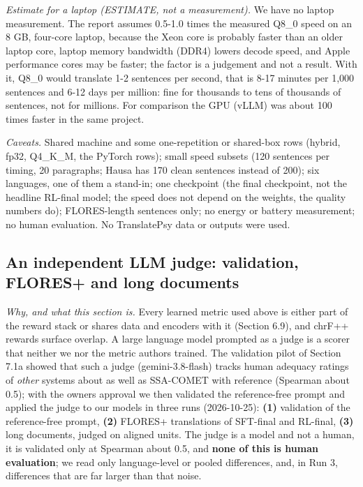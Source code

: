 \emph{Estimate for a laptop (ESTIMATE, not a measurement).} We have no laptop measurement. The report assumes 0.5-1.0 times the measured Q8\_0 speed on an 8 GB, four-core laptop, because the Xeon core is probably faster than an older laptop core, laptop memory bandwidth (DDR4) lowers decode speed, and Apple performance cores may be faster; the factor is a judgement and not a result. With it, Q8\_0 would translate 1-2 sentences per second, that is 8-17 minutes per 1,000 sentences and 6-12 days per million: fine for thousands to tens of thousands of sentences, not for millions. For comparison the GPU (vLLM) was about 100 times faster in the same project.

\emph{Caveats.} Shared machine and some one-repetition or shared-box rows (hybrid, fp32, Q4\_K\_M, the PyTorch rows); small speed subsets (120 sentences per timing, 20 paragraphs; Hausa has 170 clean sentences instead of 200); six languages, one of them a stand-in; one checkpoint (the final checkpoint, not the headline RL-final model; the speed does not depend on the weights, the quality numbers do); FLORES-length sentences only; no energy or battery measurement; no human evaluation. No TranslatePsy data or outputs were used.

\subsection{An independent LLM judge: validation, FLORES+ and long documents}\label{an-independent-llm-judge-validation-flores-and-long-documents}

\emph{Why, and what this section is.} Every learned metric used above is either part of the reward stack or shares data and encoders with it (Section 6.9), and chrF++ rewards surface overlap. A large language model prompted as a judge is a scorer that neither we nor the metric authors trained. The validation pilot of Section 7.1a showed that such a judge (gemini-3.8-flash) tracks human adequacy ratings of \emph{other} systems about as well as SSA-COMET with reference (Spearman about 0.5); with the owner\textquotesingle s approval we then validated the reference-free prompt and applied the judge to our models in three runs (2026-10-25): \textbf{(1)} validation of the reference-free prompt, \textbf{(2)} FLORES+ translations of SFT-final and RL-final, \textbf{(3)} long documents, judged on aligned units. The judge is a model and not a human, it is validated only at Spearman about 0.5, and \textbf{none of this is human evaluation}; we read only language-level or pooled differences, and, in Run 3, differences that are far larger than that noise.

